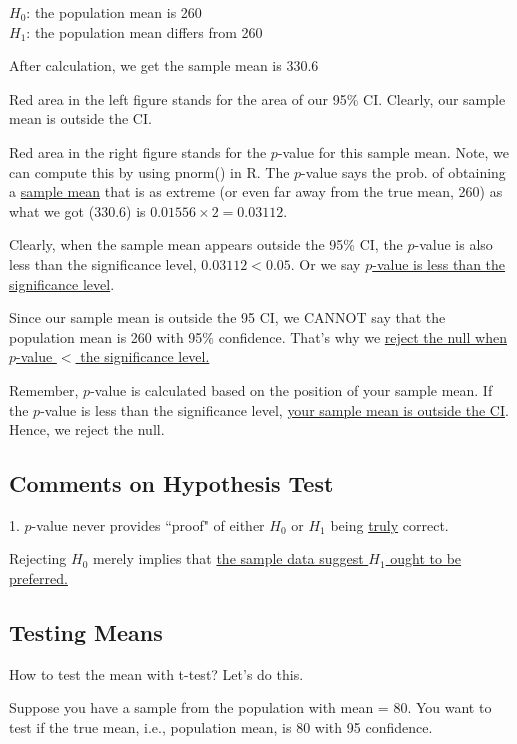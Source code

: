 \documentclass[12pt]{article}
\begin{document}
$ H_0 $: the population mean is 260\\
$ H_1 $: the population mean differs from 260

After calculation, we get the sample mean is $ 330.6 $

Red area in the left figure stands for the area of our 95\% CI.
Clearly, our sample mean is outside the CI.

Red area in the right figure stands for the $ p $-value for this sample
mean. Note, we can compute this by using pnorm() in R.
The $ p $-value says the prob. of obtaining a {\underline {sample mean}}
that is as extreme (or even far away from the true mean, 260) as what
we got (330.6) is $ 0.01556  \times 2 = 0.03112 $.


Clearly, when the sample mean appears outside the 95\% CI, the
$ p $-value is also less than the significance level, 
$ 0.03112 < 0.05 $. Or we say 
{\underline {$ p $-value is less than the significance level}}.


Since our sample mean is outside the 95 CI, we CANNOT say that
the population mean is 260 with 95\% confidence. That's why we 
{\underline {reject the null when $ p $-value $ < $ the 
significance level.}}


Remember, $ p $-value is calculated based on the position of your
sample mean. If the $ p $-value is less than the significance level, 
{\underline {your sample mean is outside the CI}}. Hence, we 
reject the null.


\subsection{Comments on Hypothesis Test}

1. $ p $-value never provides ``proof" of either $ H_0 $ or $ H_1 $ being
{\underline {truly}} correct.

Rejecting $ H_0 $ merely implies that {\underline {the sample data
suggest $ H_1 $ ought to be preferred.}}\\










\subsection{Testing Means}

How to test the mean with t-test? Let's do this.


Suppose you have a sample from the population with mean = 80. You
want to test if the true mean, i.e., population mean, is 80 with 95
confidence.
\end{document}
